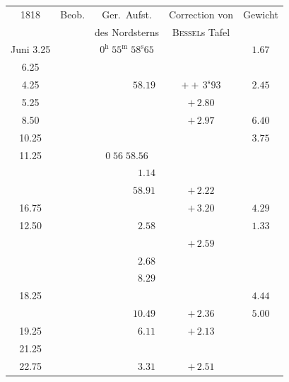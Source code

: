 \documentclass[12pt,a4paper]{article}
\begin{document}
\begin{center}
\small
\begin{tabular}{c|c|c|c|c}
\toprule
1818 & Beob. & Ger.~Aufst. & Correction von & Gewicht \\
& & des Nordsterns & \textsc{Bessel}s Tafel & \\
\midrule
Juni \phantom{0}3.25 & & $0^{\mathrm{h}}\;55^{\mathrm{m}}\;58^{\mathrm{s}}65$ & & $1.67$ \\
\phantom{0}\phantom{0}\phantom{0} 6.25 & & & & \\
\phantom{0}\phantom{0}\phantom{0} 4.25 & & $\phantom{0}\phantom{0}\phantom{0}\phantom{0}\phantom{0}\phantom{0}\phantom{0}58.19$ & $++\,3^{\mathrm{s}}93$ & $2.45$ \\
\phantom{0}\phantom{0}\phantom{0} 5.25 & & & $+\,2.80$ & \\
\phantom{0}\phantom{0}\phantom{0} 8.50 & & & $+\,2.97$ & $6.40$ \\
\phantom{0}\phantom{0} 10.25 & & & & $3.75$ \\
\phantom{0}\phantom{0} 11.25 & & $0\;56\;58.56$ & & \\
& & $\phantom{0}\phantom{0}\phantom{0}\phantom{0}\phantom{0}\phantom{0}\phantom{0}\phantom{0}1.14$ & & \\
& & $\phantom{0}\phantom{0}\phantom{0}\phantom{0}\phantom{0}\phantom{0}\phantom{0}58.91$ & $+\,2.22$ & \\
\phantom{0}\phantom{0} 16.75 & & & $+\,3.20$ & $4.29$ \\
\phantom{0}\phantom{0} 12.50 & & $\phantom{0}\phantom{0}\phantom{0}\phantom{0}\phantom{0}\phantom{0}\phantom{0}\phantom{0}2.58$ & & $1.33$ \\
& & & $+\,2.59$ & \\
& & $\phantom{0}\phantom{0}\phantom{0}\phantom{0}\phantom{0}\phantom{0}\phantom{0}\phantom{0}2.68$ & & \\
& & $\phantom{0}\phantom{0}\phantom{0}\phantom{0}\phantom{0}\phantom{0}\phantom{0}\phantom{0}8.29$ & & \\
\phantom{0}\phantom{0} 18.25 & & & & $4.44$ \\
& & $\phantom{0}\phantom{0}\phantom{0}\phantom{0}\phantom{0}\phantom{0}\phantom{0}10.49$ & $+\,2.36$ & $5.00$ \\
\phantom{0}\phantom{0} 19.25 & & $\phantom{0}\phantom{0}\phantom{0}\phantom{0}\phantom{0}\phantom{0}\phantom{0}\phantom{0}6.11$ & $+\,2.13$ & \\
\phantom{0}\phantom{0} 21.25 & & & & \\
\phantom{0}\phantom{0} 22.75 & & $\phantom{0}\phantom{0}\phantom{0}\phantom{0}\phantom{0}\phantom{0}\phantom{0}\phantom{0}3.31$ & $+\,2.51$ & \\

\end{tabular}
\end{center}
\end{document}
